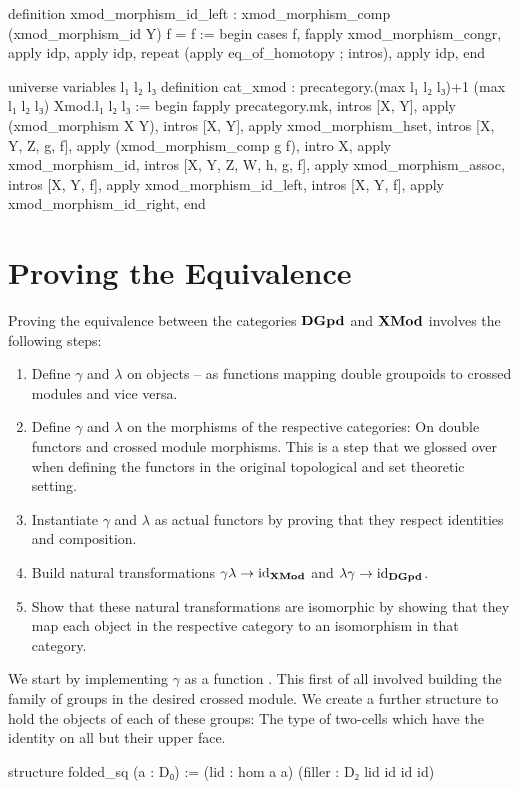 \begin{leancodebr}
  definition xmod_morphism_id_left :
    xmod_morphism_comp (xmod_morphism_id Y) f = f :=
  begin
    cases f,
    fapply xmod_morphism_congr,
        apply idp,
      apply idp,
    repeat (apply eq_of_homotopy ; intros),
    apply idp,
  end

  universe variables l₁ l₂ l₃
  definition cat_xmod :
    precategory.{(max l₁ l₂ l₃)+1 (max l₁ l₂ l₃)} Xmod.{l₁ l₂ l₃} :=
  begin
    fapply precategory.mk,
      intros [X, Y], apply (xmod_morphism X Y),
      intros [X, Y], apply xmod_morphism_hset,
      intros [X, Y, Z, g, f], apply (xmod_morphism_comp g f),
      intro X, apply xmod_morphism_id,
      intros [X, Y, Z, W, h, g, f], apply xmod_morphism_assoc,
      intros [X, Y, f], apply xmod_morphism_id_left,
    intros [X, Y, f], apply xmod_morphism_id_right,
  end
\end{leancodebr}



\section{Proving the Equivalence}

Proving the equivalence between the categories $\mathbf{DGpd}$ and $\mathbf{XMod}$ involves the
following steps:
\begin{enumerate}
\item Define $\gamma$ and $\lambda$ on objects -- as functions mapping double
groupoids to crossed modules and vice versa.
\item Define $\gamma$ and $\lambda$ on the morphisms of the respective categories:
On double functors and crossed module morphisms.
This is a step that we glossed over when defining the functors in the original topological and
set theoretic setting.
\item Instantiate $\gamma$ and $\lambda$ as actual functors by proving that
they respect identities and composition.
\item Build natural transformations $\gamma\lambda \to \operatorname{id}_{\mathbf{XMod}}$ and
$\lambda\gamma \to \operatorname{id}_{\mathbf{DGpd}}$.
\item Show that these natural transformations are isomorphic by showing that they
map each object in the respective category to an isomorphism in that category.
\end{enumerate} %

We start by implementing $\gamma$ as a function .
This first of all involved building the family of groups in the desired
crossed module.
We create a further structure to hold the objects of each of these groups:
The type of two-cells which have the identity on all but their upper face.
\begin{leancodebr}
  structure folded_sq (a : D₀) :=
    (lid : hom a a)
    (filler : D₂ lid id id id)
\end{leancodebr}

